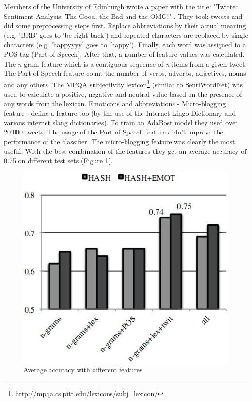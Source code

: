 \documentclass[a4paper]{article}
\begin{document}
Members of the University of Edinburgh wrote a paper with the title: "Twitter Sentiment Analysis: The Good, the Bad and the OMG!" \cite{KouloumpisWM11}. They took tweets and did some preprocessing steps first. Replace abbreviations by their actual meaning (e.g. 'BRB' goes to 'be right back') and repeated characters are replaced by single characters (e.g. 'happyyyy' goes to 'happy'). Finally, each word was assigned to a POS-tag (Part-of-Speech). After that, a number of feature values was calculated. The \textit{n}-gram feature which is a contiguous sequence of \textit{n} items from a given tweet. The Part-of-Speech feature count the number of verbs, adverbs, adjectives, nouns and any others. The MPQA subjectivity lexicon\footnote{http://mpqa.cs.pitt.edu/lexicons/subj\_lexicon/} (similar to SentiWordNet) was used to calculate a positive, negative and neutral value based on the presence of any words from the lexicon. Emoticons and abbreviations - Micro-blogging feature - define a feature too (by the use of the Internet Lingo Dictionary and various internet slang dictionaries). To train an AdaBost model they used over 20'000 tweets. The usage of the Part-of-Speech feature didn't improve the performance of the classifier. The micro-blogging feature was clearly the most useful. With the best combination of the features they get an average accuracy of 0.75 on different test sets (Figure \ref{sentimentAccuracy}).
\begin{figure}[h!]
	\centering
	\includegraphics[scale=0.5]{images/sentimentAccuracy.png}
	\caption{Average accuracy with different features}
	\label{sentimentAccuracy}
\end{figure}
\end{document}
